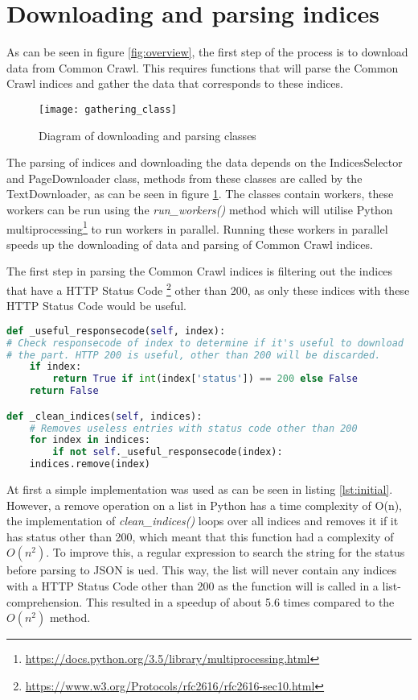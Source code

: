 \section{Downloading and parsing indices}

As can be seen in figure \ref{fig:overview}, the first step of the process is to download data from Common Crawl. This requires functions that will parse the Common Crawl indices and gather the data that corresponds to these indices. 

\begin{figure}[H]
\centering
\texttt{[image: gathering\_class]}
\caption{Diagram of downloading and parsing classes}
\label{fig:gathering_class}
\end{figure}

The parsing of indices and downloading the data depends on the IndicesSelector and PageDownloader class, methods from these classes are called by the TextDownloader, as can be seen in figure \ref{fig:gathering_class}. The classes contain workers, these workers can be run  using the \textit{run\_workers()} method which will utilise Python multiprocessing\footnote{\url{https://docs.python.org/3.5/library/multiprocessing.html}} to run workers in parallel. Running these workers in parallel speeds up the downloading of data  and parsing of Common Crawl indices.

The first step in parsing the Common Crawl indices is filtering out the indices that have a HTTP Status Code \footnote{\url{https://www.w3.org/Protocols/rfc2616/rfc2616-sec10.html}} other than 200, as only these indices with these HTTP Status Code would be useful. 

\begin{lstlisting}[language=Python, caption=Initial implementation, label={lst:initial}]
def _useful_responsecode(self, index):
# Check responsecode of index to determine if it's useful to download
# the part. HTTP 200 is useful, other than 200 will be discarded.
    if index:
        return True if int(index['status']) == 200 else False
    return False

def _clean_indices(self, indices):
    # Removes useless entries with status code other than 200
    for index in indices:
        if not self._useful_responsecode(index):
    indices.remove(index)
\end{lstlisting}

At first a simple implementation was used as can be seen in listing \ref{lst:initial}. However, a remove operation on a list in Python has a time complexity of O(n), the implementation of \textit{clean\_indices()} loops over all indices and removes it if it has status other than 200, which meant that this function had a complexity of $O(n^2)$. To improve this, a regular expression to search the string for the status before parsing to JSON is ued. This way, the list will never contain any indices with a HTTP Status Code other than 200 as the function will is called in a list-comprehension. This resulted in a speedup of about 5.6 times compared to the $O(n^2)$ method.

